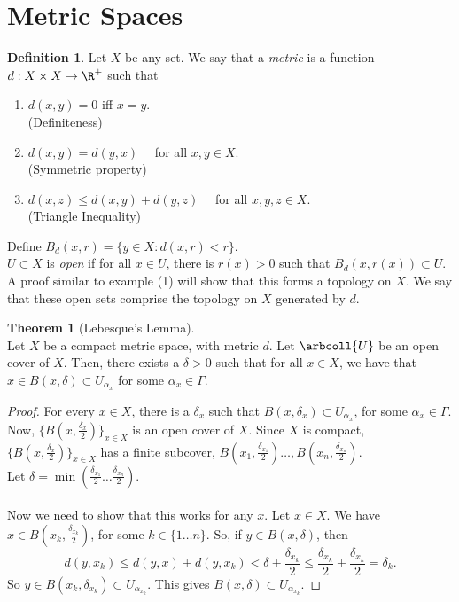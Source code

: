 \documentclass[a5paper]{article}
\theoremstyle{definition}%
\newtheorem{theorem}{Theorem}
\newtheorem*{definition*}{Definition}
\numberwithin{exercise}{section}
\theoremstyle{remark}%
\begin{document}
\section{Metric Spaces}

\begin{definition*}
Let $X$ be any set. We say that a \emph{metric} is a function $d:X\times X \to \R^+$ such that 
\begin{enumerate}
\item $d(x,y)=0$ iff $x = y$. \\
(Definiteness)
\item $d(x,y)=d(y,x)\quad$ for all $x,y \in X$.\\
(Symmetric property)
\item $d(x,z) \leq d(x,y) + d(y,z) \quad$ for all $x,y,z \in X$. \\
(Triangle Inequality)
\end{enumerate}
Define $B_d(x,r)=\{y\in X : d(x,r)<r\}$.\\
$U \subset X$ is \emph{open} if for all $x \in U$, there is $r(x)>0$ such that $B_d(x,r(x))\subset U$. 
A proof similar to example (1) will show that this forms a topology on $X$. We say that these open sets comprise the topology on $X$ generated by $d$.
\end{definition*}

\begin{highlight}
\begin{theorem}[Lebesque's Lemma]\mbox{}\\
Let $X$ be a compact metric space, with metric $d$. Let $\arbcoll{U}$ be an open cover of $X$. Then, there exists a $\delta>0$ such that for all $x\in X$, we have that $x\in B(x,\delta)\subset U_{\alpha_x}$ for some $\alpha_x\in\Gamma$. 
\end{theorem}
\end{highlight}
\begin{proof}
For every $x\in X$, there is a $\delta_x$ such that $B(x,\delta_x)\subset U_{\alpha_x}$, for some $\alpha_x\in\Gamma$. Now, $\{B(x,\frac{\delta_x}{2})\}_{x\in X}$ is an open cover of $X$. Since $X$ is compact, $\{B(x,\frac{\delta_x}{2})\}_{x\in X}$ has a finite subcover, $B(x_1,\frac{\delta_{x_1}}{2})\ldots, B(x_n,\frac{\delta_{x_n}}{2})$. \\
Let $\delta=\min(\frac{\delta_{x_1}}{2}\ldots\frac{\delta_{x_n}}{2})$. \\
\\
Now we need to show that this works for any $x$. Let $x\in X$. We have $x\in B(x_k, \frac{\delta_{x_k}}{2})$, for some $k\in\{1\ldots n\}$. So, if $y\in B(x,\delta)$, then 
$$d(y,x_k) \leq d(y,x) + d(y,x_k)< \delta + \frac{\delta_{x_k}}{2} \leq \frac{\delta_{x_k}}{2} + \frac{\delta_{x_k}}{2} = \delta_k. $$
So $y\in B(x_k, \delta_{x_k})\subset U_{\alpha_{x_k}}$. This gives $B(x,\delta)\subset U_{\alpha_{x_k}}$.
\end{proof}
\end{document}
